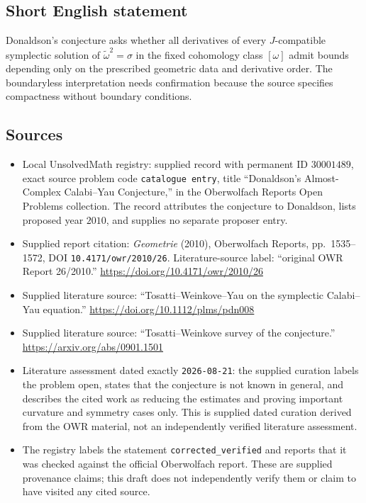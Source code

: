 \documentclass[11pt]{article}
\begin{document}
\subsection{Short English statement}
Donaldson's conjecture asks whether all derivatives of every \(J\)-compatible symplectic solution of \(\widetilde\omega^2=\sigma\) in the fixed cohomology class \([\omega]\) admit bounds depending only on the prescribed geometric data and derivative order. The boundaryless interpretation needs confirmation because the source specifies compactness without boundary conditions.
\subsection{Sources}
\begin{itemize}
\item Local UnsolvedMath registry: supplied record with permanent ID \(30001489\), exact source problem code \texttt{catalogue entry}, title ``Donaldson's Almost-Complex Calabi--Yau Conjecture,'' in the Oberwolfach Reports Open Problems collection. The record attributes the conjecture to Donaldson, lists proposed year \(2010\), and supplies no separate proposer entry.
\item Supplied report citation: \emph{Geometrie} (2010), Oberwolfach Reports, pp.\ 1535--1572, DOI \texttt{10.4171/owr/2010/26}. Literature-source label: ``original OWR Report 26/2010.'' \url{https://doi.org/10.4171/owr/2010/26}
\item Supplied literature source: ``Tosatti--Weinkove--Yau on the symplectic Calabi--Yau equation.'' \url{https://doi.org/10.1112/plms/pdn008}
\item Supplied literature source: ``Tosatti--Weinkove survey of the conjecture.'' \url{https://arxiv.org/abs/0901.1501}
\item Literature assessment dated exactly \texttt{2026-08-21}: the supplied curation labels the problem open, states that the conjecture is not known in general, and describes the cited work as reducing the estimates and proving important curvature and symmetry cases only. This is supplied dated curation derived from the OWR material, not an independently verified literature assessment.
\item The registry labels the statement \texttt{corrected\_verified} and reports that it was checked against the official Oberwolfach report. These are supplied provenance claims; this draft does not independently verify them or claim to have visited any cited source.
\end{itemize}
\end{document}
